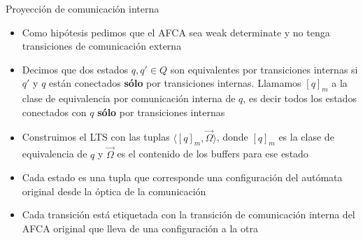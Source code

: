 \documentclass[10pt,xcolor={table,dvipsnames},t]{beamer}
\begin{document}
\begin{frame}{Proyección de comunicación interna}
 \vspace{\fill}
\begin{itemize}
    \item Como hipótesis pedimos que el AFCA sea weak determinate y no tenga transiciones de comunicación externa
    \item Decimos que dos estados $q, q' \in Q$ son equivalentes por transiciones internas si $q'$ y $q$ están conectados \textbf{sólo} por transiciones internas. Llamamos $[q]_m$ a la clase de equivalencia por comunicación interna de $q$, es decir todos los estados conectados con $q$ \textbf{sólo} por transiciones internas 
    \item Construimos el LTS con las tuplas $\langle [q]_m, \overrightarrow{\Omega} \rangle$, donde $[q]_m$ es la clase de equivalencia de $q$ y $\overrightarrow{\Omega}$ es el contenido de los buffers para ese estado
    \item Cada estado es una tupla que corresponde una configuración del autómata original desde la óptica de la comunicación
    \item Cada transición está etiquetada con la transición de comunicación interna del AFCA original que lleva de una configuración a la otra
\end{itemize}
 \vspace{\fill}

\end{frame}
\end{document}
